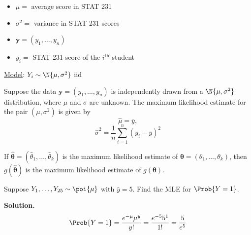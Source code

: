 \begin{Example}{}{}
    \begin{itemize}
        \item $ \mu = $ average score in STAT 231
        \item $ \sigma^2= $ variance in STAT 231 scores
        \item $ \symbf{y}=(y_1,\ldots ,y_n) $
        \item $ y_i= $ STAT 231 score of the $ i^{\text{th}} $ student
    \end{itemize}
    \underline{Model}: $ Y_i \sim \N{\mu,\sigma^2} $ iid
\end{Example}



\begin{Proposition}{}{}
    Suppose the data $ \symbf{y}=(y_1,\ldots ,y_n) $ is independently
    drawn from a $ \N{\mu,\sigma^2} $ distribution,
    where $ \mu $ and $ \sigma $ are unknown. The maximum
    likelihood estimate for the pair $ (\mu,\sigma^2) $ is given by
    \[ \hat{\mu}=\bar{y}, \]
    \[ \hat{\sigma}^2=\frac{1}{n} \sum\limits_{i=1}^{n} \left( y_i-\bar{y} \right)^2 \]
\end{Proposition}



\begin{Theorem}{}{}
    If $ \hat{\symbf{\theta}}=(\hat{\theta}_1,\ldots ,\hat{\theta}_k) $ is the maximum likelihood
    estimate of $ \symbf{\theta}=(\theta_1,\ldots ,\theta_k) $, then
    $ g(\symbf{\hat{\theta}}) $ is the maximum likelihood estimate of $ g(\symbf{\theta}) $.
\end{Theorem}



\begin{Example}{}{}
    Suppose $ Y_1,\ldots ,Y_{25} \sim \poi{\mu} $ with $ \bar{y}=5 $.
    Find the MLE for $ \Prob{Y=1} $.

    \textbf{Solution.}
    \[ \Prob{Y=1}=\frac{e^{-\mu}\mu^y}{y!}=\frac{e^{-5}5^1}{1!}=\frac{5}{e^5} \]
\end{Example}

